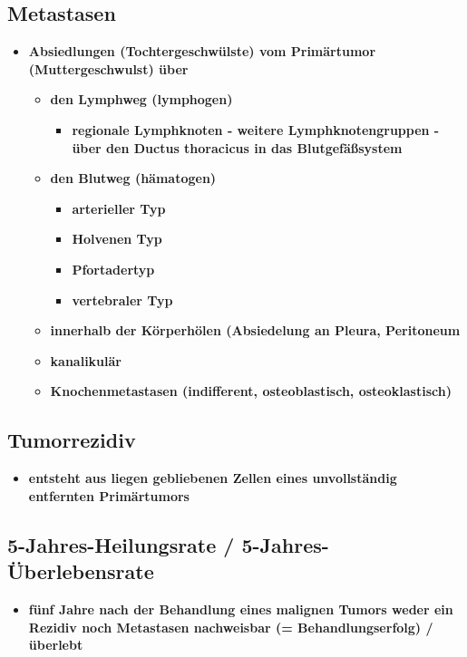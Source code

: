	\subsection{Metastasen}
		\begin{itemize}
			\item \textbf{Absiedlungen (Tochtergeschwülste) vom Primärtumor (Muttergeschwulst) über}
				\begin{itemize}
					\item \textbf{den Lymphweg (lymphogen)}
						\begin{itemize}
							\item \textbf{regionale Lymphknoten - weitere Lymphknotengruppen - über den Ductus thoracicus in das Blutgefäßsystem}
						\end{itemize}
					\item \textbf{den Blutweg (hämatogen)}
						\begin{itemize}
							\item \textbf{arterieller Typ}
							\item \textbf{Holvenen Typ}
							\item \textbf{Pfortadertyp}
							\item \textbf{vertebraler Typ}
						\end{itemize}
					\item \textbf{innerhalb der Körperhölen (Absiedelung an Pleura, Peritoneum}
					\item \textbf{kanalikulär}
					\item \textbf{Knochenmetastasen (indifferent, osteoblastisch, osteoklastisch)}
				\end{itemize}
		\end{itemize}
	\subsection{Tumorrezidiv}
		\begin{itemize}
			\item \textbf{entsteht aus liegen gebliebenen Zellen eines unvollständig entfernten Primärtumors}
		\end{itemize}
	\subsection{5-Jahres-Heilungsrate / 5-Jahres-Überlebensrate}
		\begin{itemize}
			\item \textbf{fünf Jahre nach der Behandlung eines malignen Tumors weder ein Rezidiv noch Metastasen nachweisbar (= Behandlungserfolg) / überlebt}
		\end{itemize}
